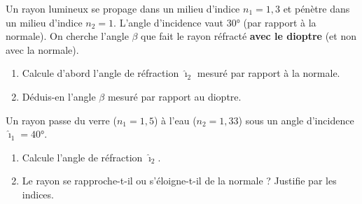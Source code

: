 \documentclass[11pt,a4paper]{article}
\begin{document}
\begin{exo}
Un rayon lumineux se propage dans un milieu d'indice $n_1=1{,}3$ et pénètre dans un milieu d'indice
$n_2=1$. L'angle d'incidence vaut $\ang{30}$ (par rapport à la normale). On cherche l'angle
$\beta$ que fait le rayon réfracté \textbf{avec le dioptre} (et non avec la normale).
\begin{center}
\end{center}
\begin{enumerate}[label=\alph*)]
  \item Calcule d'abord l'angle de réfraction $\hat{\imath}_2$ mesuré par rapport à la normale.
  \item Déduis-en l'angle $\beta$ mesuré par rapport au dioptre.
\end{enumerate}
\end{exo}

\begin{exo}
Un rayon passe du verre ($n_1=1{,}5$) à l'eau ($n_2=1{,}33$) sous un angle d'incidence
$\hat{\imath}_1=\ang{40}$.
\begin{enumerate}[label=\alph*)]
  \item Calcule l'angle de réfraction $\hat{\imath}_2$.
  \item Le rayon se rapproche-t-il ou s'éloigne-t-il de la normale ? Justifie par les indices.
\end{enumerate}
\end{exo}
\end{document}
